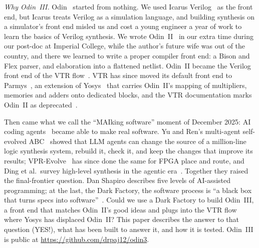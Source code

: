 \documentclass[conference]{IEEEtran}
\begin{document}
\emph{Why Odin~III.}
Odin~\cite{jamieson2005odin} started from nothing. We used Icarus Verilog~\cite{icarus} as the front end, but Icarus treats Verilog as a simulation language, and building synthesis on a simulator's front end misled us and cost a young engineer a year of work to learn the basics of Verilog synthesis. We wrote Odin~II~\cite{jamieson2011odin2} in our extra time during our post-doc at Imperial College, while the author's future wife was out of the country, and there we learned to write a proper compiler front end: a Bison and Flex parser, and elaboration into a flattened netlist. Odin~II became the Verilog front end of the VTR flow~\cite{rose2012vtr,luu2014vtr7}. VTR has since moved its default front end to Parmys~\cite{parmys}, an extension of Yosys~\cite{wolf2013yosys,yosys} that carries Odin~II's mapping of multipliers, memories and adders onto dedicated blocks, and the VTR documentation marks Odin~II as deprecated~\cite{vtrodindoc}. %

Then came what we call the ``MAIking software'' moment of December 2025: AI coding agents~\cite{claudecode} became able to make real software. Yu and Ren's multi-agent self-evolved ABC~\cite{yu2026selfevolvedabc} showed that LLM agents can change the source of a million-line logic synthesis system, rebuild it, check it, and keep the changes that improve its results; VPR-Evolve~\cite{wu2026vprevolve} has since done the same for FPGA place and route, and Ding et al.\ survey high-level synthesis in the agentic era~\cite{ding2026hlsagentic}. Together they raised the final-frontier question. Dan Shapiro describes five levels of AI-assisted programming; at the last, the Dark Factory, the software process is ``a black box that turns specs into software''~\cite{shapiro2026darkfactory}. %
Could we use a Dark Factory to build Odin~III, a front end that matches Odin~II's good ideas and plugs into the VTR flow where Yosys has displaced Odin~II? This paper describes the answer to that question (YES!), what has been built to answer it, and how it is tested. Odin~III is public at \url{https://github.com/drpaj12/odin3}.
\end{document}
